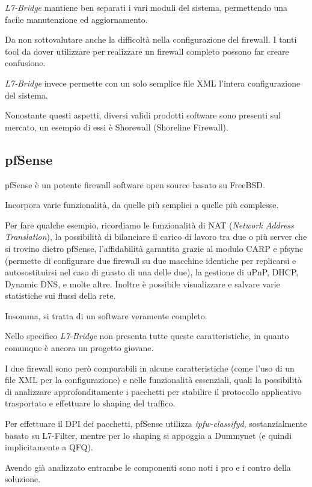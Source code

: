 \emph{L7-Bridge} mantiene ben separati i vari moduli del sistema, permettendo una facile manutenzione ed aggiornamento.

Da non sottovalutare anche la difficoltà nella configurazione del firewall. I tanti tool da dover utilizzare per realizzare un firewall completo possono far creare confusione.

\emph{L7-Bridge} invece permette con un solo semplice file XML l'intera configurazione del sistema.

Nonostante questi aspetti, diversi validi prodotti software sono presenti sul mercato, un esempio di essi è Shorewall (Shoreline Firewall).

\subsection{pfSense}

pfSense \citep{pfsense} è un potente firewall software open source basato su FreeBSD.

Incorpora varie funzionalità, da quelle più semplici a quelle più complesse.

Per fare qualche esempio, ricordiamo le funzionalità di NAT (\emph{Network Address Translation}), la possibilità di bilanciare il carico di lavoro tra due o più server che si trovino dietro pfSense, l'affidabilità garantita grazie al modulo CARP e pfsync (permette di configurare due firewall su due macchine identiche per replicarsi e autosostituirsi nel caso di guasto di una delle due), la gestione di uPnP, DHCP, Dynamic DNS, e molte altre. Inoltre è possibile visualizzare e salvare varie statistiche sui flussi della rete.

Insomma, si tratta di un software veramente completo.

Nello specifico \emph{L7-Bridge} non presenta tutte queste caratteristiche, in quanto comunque è ancora un progetto giovane.

I due firewall sono però comparabili in alcune caratteristiche (come l'uso di un file XML per la configurazione) e nelle funzionalità essenziali, quali la possibilità di analizzare approfonditamente i pacchetti per stabilire il protocollo applicativo trasportato e effettuare lo shaping del traffico.

Per effettuare il DPI dei pacchetti, pfSense utilizza \emph{ipfw-classifyd}, sostanzialmente basato su L7-Filter, mentre per lo shaping si appoggia a Dummynet (e quindi implicitamente a QFQ).

Avendo già analizzato entrambe le componenti sono noti i pro e i contro della soluzione.


